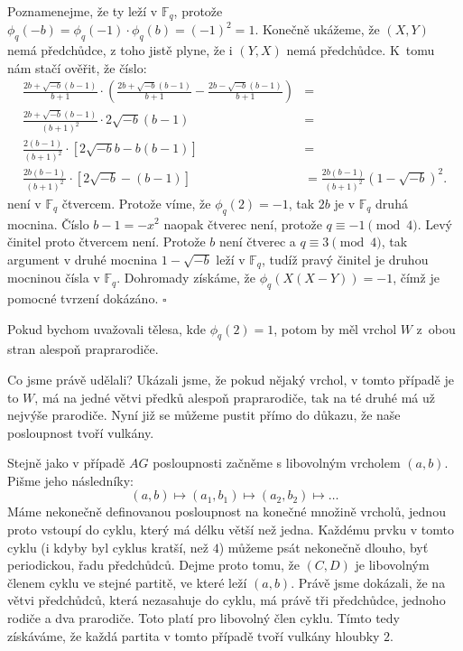 \documentclass[12pt]{report}
\begin{document}
Poznamenejme, že ty leží v $\mathbb{F}_q$, protože $\phi_q(-b) = \phi_q(-1)\cdot \phi_q(b) = (-1)^2 = 1$. Konečně ukážeme, že $(X,Y)$ nemá předchůdce, z toho jistě plyne, že i $(Y,X)$ nemá předchůdce. K~tomu nám stačí ověřit, že číslo:
\begin{align*}
\frac{2b + \sqrt{-b}(b-1)}{b+1} \cdot \left( \frac{2b + \sqrt{-b}(b-1)}{b+1} - \frac{2b - \sqrt{-b}(b-1)}{b+1} \right) &=\\
\frac{2b + \sqrt{-b}(b-1)}{(b+1)^2} \cdot 2 \sqrt{-b}(b-1)&=\\
\frac{2 (b-1)}{(b+1)^2} \cdot [2 \sqrt{-b} b - b(b-1)] &=\\
\frac{2 b(b-1)}{(b+1)^2} \cdot [2 \sqrt{-b}-(b-1)] &= \frac{2 b(b-1)}{(b+1)^2} (1-\sqrt{-b})^2.
\end{align*}
není v $\mathbb{F}_q$ čtvercem. Protože víme, že $\phi_q(2) = -1$, tak $2b$ je v $\mathbb{F}_q$ druhá mocnina. Číslo $b-1 = -x^2$ naopak čtverec není, protože $q \equiv -1 \pmod{4}$. Levý činitel proto čtvercem není. Protože $b$ není čtverec a $q \equiv 3 \pmod{4}$, tak argument v druhé mocnina $1-\sqrt{-b}$ leží v $\mathbb{F}_q$, tudíž pravý činitel je druhou mocninou čísla v $\mathbb{F}_q$. Dohromady získáme, že $\phi_q (X(X-Y)) = -1$, čímž je pomocné tvrzení dokázáno. \hfill $\square$

\begin{poznamka}
Pokud bychom uvažovali tělesa, kde $\phi_q(2) =1$, potom by měl vrchol $W$ z~obou stran alespoň praprarodiče.
\end{poznamka}

Co jsme právě udělali? Ukázali jsme, že pokud nějaký vrchol, v tomto případě je to $W$, má na jedné větvi předků alespoň praprarodiče, tak na té druhé má už nejvýše prarodiče. Nyní již se můžeme pustit přímo do důkazu, že naše posloupnost tvoří vulkány.

Stejně jako v případě $AG$ posloupnosti začněme s libovolným vrcholem $(a,b)$. Pišme jeho následníky:
$$(a,b)\longmapsto (a_1,b_1)\longmapsto (a_2, b_2) \longmapsto \dots$$
Máme nekonečně definovanou posloupnost na konečné množině vrcholů, jednou proto vstoupí do cyklu, který má délku větší než jedna. Každému prvku v tomto cyklu (i kdyby byl cyklus kratší, než $4$) můžeme psát nekonečně dlouho, byť periodickou, řadu předchůdců. Dejme proto tomu, že $(C,D)$ je libovolným členem cyklu ve stejné partitě, ve které leží $(a,b)$. Právě jsme dokázali, že na větvi předchůdců, která nezasahuje do cyklu, má právě tři předchůdce, jednoho rodiče a dva prarodiče. Toto platí pro libovolný člen cyklu. Tímto tedy získáváme, že každá partita v tomto případě tvoří vulkány hloubky $2$.
\end{document}
